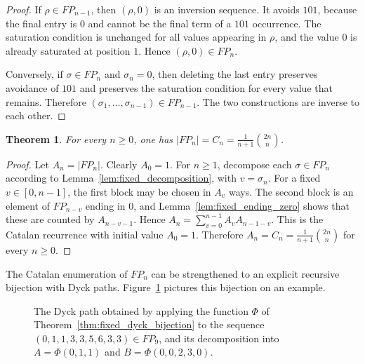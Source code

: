 \documentclass[11pt]{article}
\newtheorem{thm}{Theorem}[section]
\theoremstyle{remark}
\theoremstyle{definition}
\begin{document}
\begin{proof}
If $\rho\in FP_{n-1}$, then $(\rho,0)$ is an inversion sequence. It avoids $101$, because the final entry is $0$ and cannot be the final term of a $101$ occurrence. The saturation condition is unchanged for all values appearing in $\rho$, and the value $0$ is already saturated at position $1$. Hence $(\rho,0)\in FP_n$.

Conversely, if $\sigma\in FP_n$ and $\sigma_n=0$, then deleting the last entry preserves avoidance of $101$ and preserves the saturation condition for every value that remains. Therefore $(\sigma_1,\ldots,\sigma_{n-1})\in FP_{n-1}$. The two constructions are inverse to each other.
\end{proof}

\begin{thm}\label{thm:catalan_enumeration}
For every $n\geq0$, one has $|FP_n|=C_n=\frac{1}{n+1}\binom{2n}{n}$.
\end{thm}

\begin{proof}
Let $A_n=|FP_n|$. Clearly $A_0=1$. For $n\geq1$, decompose each $\sigma\in FP_n$ according to Lemma~\ref{lem:fixed_decomposition}, with $v=\sigma_n$. For a fixed $v\in[0,n-1]$, the first block may be chosen in $A_v$ ways. The second block is an element of $FP_{n-v}$ ending in $0$, and Lemma~\ref{lem:fixed_ending_zero} shows that these are counted by $A_{n-v-1}$. Hence $A_n=\sum_{v=0}^{n-1}A_vA_{n-1-v}$. This is the Catalan recurrence with initial value $A_0=1$. Therefore $A_n=C_n=\frac{1}{n+1}\binom{2n}{n}$ for every $n\geq0$.
\end{proof}

The Catalan enumeration of $FP_n$ can be strengthened to an explicit recursive bijection with Dyck paths. Figure~\ref{fig:Dyck_path} pictures this bijection on an example.

\begin{figure}[ht]
\centering
{}
\caption{The Dyck path obtained by applying the function $\Phi$ of Theorem~\ref{thm:fixed_dyck_bijection} to the sequence $(0,1,1,3,3,5,6,3,3) \in FP_9$, and its decomposition into $A = \Phi(0,1,1)$ and $B = \Phi(0,0,2,3,0)$.}
\label{fig:Dyck_path}
\end{figure}
\end{document}
